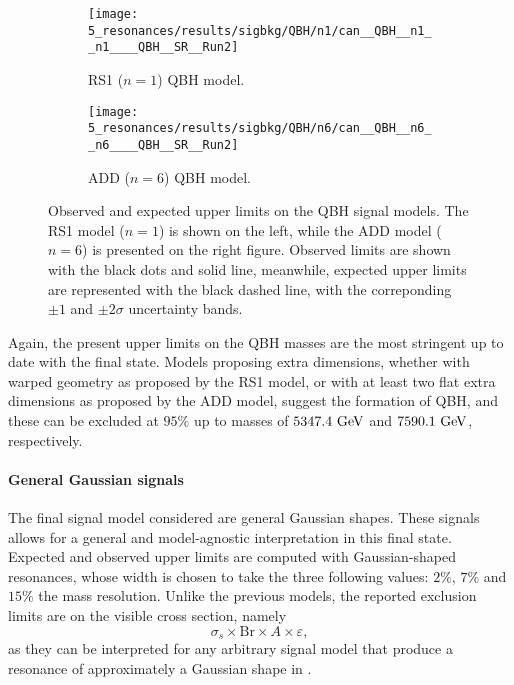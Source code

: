 \begin{figure}[ht!]
    \centering
    \begin{subfigure}[h]{0.49\linewidth}
        \centering
        \texttt{[image: 5\_resonances/results/sigbkg/QBH/n1/can\_\_QBH\_\_n1\_\_n1\_\_\_\_QBH\_\_SR\_\_Run2]}
        \caption{RS1 (\(n=1\)) \ac{QBH} model.}
    \end{subfigure}
    \hfill
    \begin{subfigure}[h]{0.49\linewidth}
        \centering
        \texttt{[image: 5\_resonances/results/sigbkg/QBH/n6/can\_\_QBH\_\_n6\_\_n6\_\_\_\_QBH\_\_SR\_\_Run2]}
        \caption{ADD (\(n=6\)) \ac{QBH} model.}
    \end{subfigure}
    \caption{Observed and expected upper limits on the \ac{QBH} signal models. The RS1 model (\(n=1\)) is shown on the left, while the ADD model (\(n=6\)) is presented on the right figure. Observed limits are shown with the black dots and solid line, meanwhile, expected upper limits are represented with the black dashed line, with the correponding \(\pm 1\) and \(\pm 2 \sigma\) uncertainty bands.}
    \label{fig:results:results:bkgsig:results:qbh:limits}
\end{figure}

Again, the present upper limits on the \ac{QBH} masses are the most stringent up to date with the \gammajet final state. Models proposing extra dimensions, whether with warped geometry as proposed by the RS1 model, or with at least two flat extra dimensions as proposed by the ADD model, suggest the formation of \ac{QBH}, and these can be excluded at \(95\%\) up to masses of \(5347.4~\text{GeV}\) and \(7590.1~\text{GeV}\), respectively.




\paragraph{General Gaussian signals}
\label{paragraph:results:results:bkgsig:results:gaus}


The final signal model considered are general Gaussian shapes. These signals allows for a general and model-agnostic interpretation in this final state. Expected and observed upper limits are computed with Gaussian-shaped resonances, whose width is chosen to take the three following values: \(2\%\), \(7\%\) and \(15\%\) the mass resolution. Unlike the previous models, the reported exclusion limits are on the visible cross section, namely
\begin{equation}
    \sigma_s \times \text{Br} \times A \times \varepsilon,
\end{equation}
as they can be interpreted for any arbitrary signal model that produce a \gammajet resonance of approximately a Gaussian shape in \myj.

